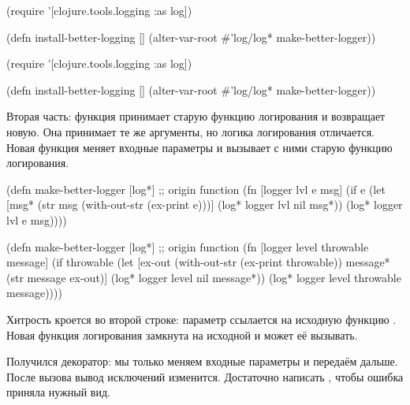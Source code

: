 \begin{clojure}
(require '[clojure.tools.logging :as log])

(defn install-better-logging []
  (alter-var-root
    #'log/log* make-better-logger))
\end{clojure}

\else

\begin{clojure}
(require '[clojure.tools.logging :as log])

(defn install-better-logging []
  (alter-var-root #'log/log* make-better-logger))
\end{clojure}

\fi

Вторая часть: функция  принимает старую функцию
логирования и возвращает новую. Она принимает те же аргументы, но логика
логирования отличается. Новая функция меняет входные параметры и вызывает с ними
старую функцию логирования.

\ifnarrow

\begin{clojure/lines}
(defn make-better-logger
  [log*] ;; origin function
  (fn [logger lvl e msg]
    (if e
      (let [msg*
            (str msg \newline
                 (with-out-str
                   (ex-print e)))]
        (log* logger lvl nil msg*))
      (log* logger lvl e msg))))
\end{clojure/lines}

\else

\begin{clojure/lines}
(defn make-better-logger
  [log*] ;; origin function
  (fn [logger level throwable message]
    (if throwable
      (let [ex-out (with-out-str (ex-print throwable))
            message* (str message \newline ex-out)]
        (log* logger level nil message*))
      (log* logger level throwable message))))
\end{clojure/lines}

\fi

Хитрость кроется во второй строке: параметр  ссылается на исходную
функцию . Новая функция логирования замкнута на
исходной и может её вызывать.

Получился декоратор: мы только меняем входные параметры и передаём дальше. После
вызова  вывод исключений изменится. Достаточно
написать , чтобы ошибка приняла нужный вид.

